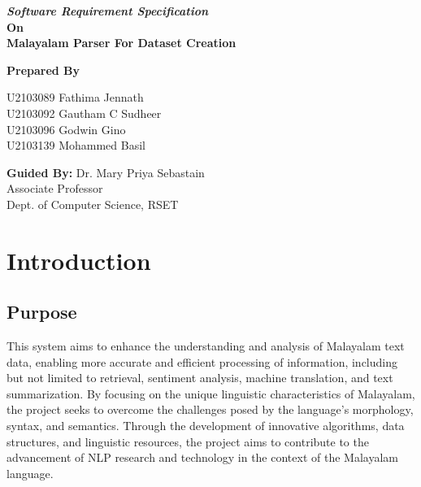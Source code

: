\documentclass[12pt]{article}
\begin{document}
	\newpage
	
	\begin{center}
		
		
		\textbf{\textit{
				{\fontsize{16pt}{19.2pt}\selectfont
					Software Requirement Specification}}\medskip
			{\fontsize{14pt}{16.8pt}\selectfont
				\\On\medskip\\Malayalam Parser For Dataset Creation}
		}
		
		\bigskip
		
		{
			
			\textbf{{\fontsize{14pt}{16.8pt}\selectfont Prepared By\\}}
			
			U2103089 Fathima Jennath\\
			U2103092 Gautham C Sudheer\\
			U2103096 Godwin Gino\\
			U2103139 Mohammed Basil\\
		}
	
		\bigskip \bigskip \bigskip
	
	
		{\fontsize{16pt}{19.2pt}\selectfont \textbf{Guided By: } Dr. Mary Priya Sebastain\\
		\hspace{1.8cm}Associate Professor\\
		\hspace{5.2cm}Dept. of Computer Science, RSET\\}
		
	\end{center}
	
	\newpage
	\pagestyle{headerstyle}
	
	\tableofcontents
	
	\newpage
	\setcounter{page}{1}
	
	\section{Introduction}
	
	\subsection{Purpose}
	This system aims to enhance the understanding and analysis of Malayalam text data, enabling more accurate and efficient processing of information, including but not limited to retrieval, sentiment analysis, machine translation, and text summarization. By focusing on the unique linguistic characteristics of Malayalam, the project seeks to overcome the challenges posed by the language's morphology, syntax, and semantics. Through the development of innovative algorithms, data structures, and linguistic resources, the project aims to contribute to the advancement of NLP research and technology in the context of the Malayalam language.
	
\end{document}
